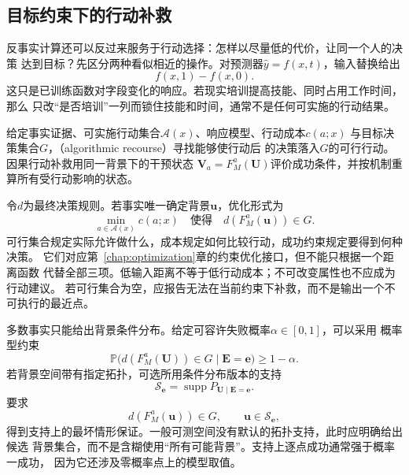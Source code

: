 \subsection{目标约束下的行动补救}
\label{sec:causal-action-recourse}

反事实计算还可以反过来服务于行动选择：怎样以尽量低的代价，让同一个人的决策
达到目标？先区分两种看似相近的操作。对预测器\(\widehat y=f(x,t)\)，输入替换给出
\[
  f(x,1)-f(x,0).
\]
这只是已训练函数对字段变化的响应。若现实培训提高技能、同时占用工作时间，那么
只改“是否培训”一列而锁住技能和时间，通常不是任何可实施的行动结果。

\begin{definition}[因果行动补救]
  \label{def:causal-recourse}
  给定事实证据、可实施行动集合\(\mathcal A(x)\)、响应模型、行动成本\(c(a;x)\)
  与目标决策集合\(G\)，（algorithmic recourse）寻找能够使行动后
  的决策落入\(G\)的可行行动。因果行动补救用同一背景下的干预状态
  \(\bm V_a=F_M^a(\bm U)\)评价成功条件，并按机制重算所有受行动影响的状态。
\end{definition}

令\(d\)为最终决策规则。若事实唯一确定背景\(\bm u\)，优化形式为
\begin{equation}
  \min_{a\in\mathcal A(x)}c(a;x)
  \quad\text{使得}\quad d(F_M^a(\bm u))\in G.
  \label{eq:causal-recourse-objective}
\end{equation}
可行集合规定实际允许做什么，成本规定如何比较行动，成功约束规定要得到何种决策。
它们对应第~\ref{chap:optimization}章的约束优化接口，但不能只根据一个距离函数
代替全部三项。低输入距离不等于低行动成本；不可改变属性也不应成为行动建议。
若可行集合为空，应报告无法在当前约束下补救，而不是输出一个不可执行的最近点。

多数事实只能给出背景条件分布。给定可容许失败概率\(\alpha\in[0,1]\)，可以采用
概率型约束
\begin{equation}
  \mathbb P\bigl(d(F_M^a(\bm U))\in G\mid\bm E=\bm e\bigr)
  \geq1-\alpha.
  \label{eq:causal-recourse-probability}
\end{equation}
若背景空间带有指定拓扑，可选所用条件分布版本的支持
\[
  \mathcal S_{\bm e}
  =\operatorname{supp}P_{\bm U\mid\bm E=\bm e}.
\]
要求
\begin{equation}
  d(F_M^a(\bm u))\in G,\qquad \bm u\in\mathcal S_{\bm e},
  \label{eq:causal-recourse-robust}
\end{equation}
得到支持上的最坏情形保证。一般可测空间没有默认的拓扑支持，此时应明确给出候选
背景集合，而不是含糊使用“所有可能背景”。支持上逐点成功通常强于概率一成功，
因为它还涉及零概率点上的模型取值。

